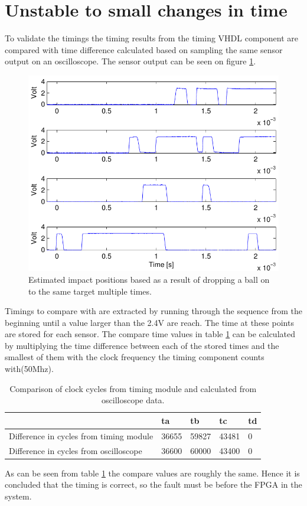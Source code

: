 \section{Unstable to small changes in time}
To validate the timings the timing results from the timing VHDL component are compared with time difference calculated based on sampling the same sensor output on an oscilloscope. The sensor output can be seen on figure \ref{fig:timingPlot}. 
\begin{figure}[htb]
	\centering
	\includegraphics[width=.8\textwidth]{figures/timingPlot.pdf}
	\caption{Estimated impact positions based as a result of dropping a ball on to the same target multiple times.}
	\label{fig:timingPlot}
\end{figure}
Timings to compare with are extracted by running through the sequence from the beginning until a value larger than the 2.4V are reach. The time at these points are stored for each sensor. The compare time values in table \ref{tbl:compareCycles} can be calculated by multiplying the time difference between each of the stored times and the smallest of them with the clock frequency the timing component counts with(50Mhz). 
%
\begin{table}[h]
	\begin{tabular}{|l|l|l|l|l|}
		\hline		
		 & ta & tb & tc & td \\
		 \hline		
		Difference in cycles from timing module & 36655 & 59827 & 43481 & 0 \\	
		 \hline
		Difference in cycles from oscilloscope & 36600 &  60000 &  43400 & 0 \\		
		\hline				
	\end{tabular}
	\caption{Comparison of clock cycles from timing module and calculated from oscilloscope data.}
	\label{tbl:compareCycles}
\end{table}
%
As can be seen from table \ref{tbl:compareCycles} the compare values are roughly the same. Hence it is concluded that the timing is correct, so the fault must be before the FPGA in the system.
